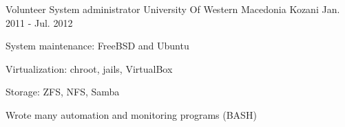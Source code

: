 


\begin{cventries}


\cventry
{Volunteer System administrator} %
{University Of Western Macedonia} %
{Kozani} %
{Jan. 2011 - Jul. 2012} %
{ %
\begin{cvitems}
\item {System maintenance: FreeBSD and Ubuntu}
\item {Virtualization: chroot, jails, VirtualBox}
\item {Storage: ZFS, NFS, Samba}
\item {Wrote many automation and monitoring programs (BASH)}
\end{cvitems}
}


\end{cventries}